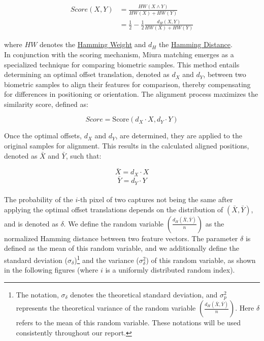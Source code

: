 \begin{equation} \label{eq:score}
    \begin{aligned}
        Score(X, Y) &= \frac{HW(X \land Y)}{HW(X) + HW(Y)}\\
        &= \frac{1}{2}-\frac{1}{2}\frac{d_H(X, Y)}{HW(X) + HW(Y)}
    \end{aligned}
\end{equation}

where \(HW\) denotes the \hyperref[def:Hamming Weight]{Hamming Weight} and \(d_H\) the \hyperref[def:Hamming Distance]{Hamming Distance}.\\ 
\newpage
In conjunction with the scoring mechanism, Miura matching emerges as a specialized technique for comparing biometric samples. This method entails determining an optimal offset translation, denoted as \(d_X\) and \(d_Y\), between two biometric samples to align their features for comparison, thereby compensating for differences in positioning or orientation. The alignment process maximizes the similarity score, defined as:

\[Score = \text{Score}(d_X \cdot X, d_Y \cdot Y)\]

Once the optimal offsets, \(d_X\) and \(d_Y\), are determined, they are applied to the original samples for alignment. This results in the calculated aligned positions, denoted as \(\bar{X}\) and \(\bar{Y}\), such that:

\[\bar{X} = d_X \cdot X\]
\[\bar{Y} = d_Y \cdot Y\]\\

The probability of the \(i\)-th pixel of two captures not being the same after applying the optimal offset translations depends on the distribution of \((\bar{X}, \bar{Y})\), and is denoted as \(\delta\). We define the random variable \(\left( \frac{d_H(\bar{X}, \bar{Y})}{n} \right)\) as the normalized Hamming distance between two feature vectors. The parameter \(\delta\) is defined as the mean of this random variable, and we additionally define the standard deviation (\(\sigma_{\delta}\))\footnote{The notation, \(\sigma_{\delta}\) denotes the theoretical standard deviation, and \(\sigma^2_p \) represents the theoretical variance of the random variable \(\left( \frac{d_H(\bar{X}, \bar{Y})}{n} \right)\). Here $\delta$ refers to the mean of this random variable. These notations will be used consistently throughout our report.} and the variance (\(\sigma^2_{\delta}\)) of this random variable, as shown in the following figures (where \(i\) is a uniformly distributed random index).


